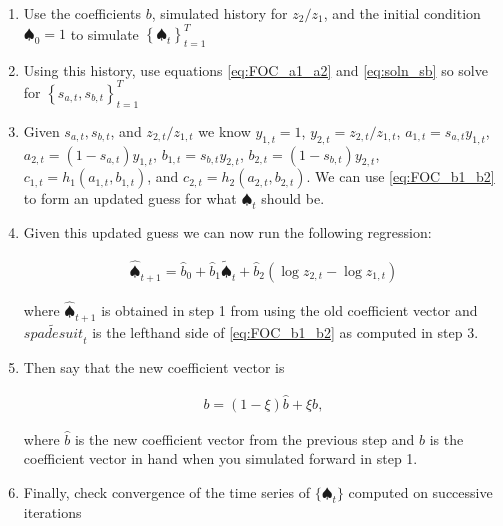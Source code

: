 \documentclass[19pt]{article}
\begin{document}
\begin{enumerate}
  \item Use the coefficients $b$, simulated history for $z_2/z_1$, and the initial condition $\spadesuit_0 = 1$ to simulate $\left\{ \spadesuit_t \right\}_{t=1}^{T}$
  \item Using this history, use equations \eqref{eq:FOC_a1_a2} and \eqref{eq:soln_sb} so solve for $\left\{ s_{a,t}, s_{b,t} \right\}_{t=1}^{T}$
  \item Given $s_{a,t}, s_{b,t}$, and $z_{2,t}/z_{1,t}$ we know $y_{1,t}=1$, $y_{2,t} = z_{2,t}/z_{1,t}$, $a_{1,t} = s_{a,t} y_{1,t}$, $a_{2,t} = (1-s_{a,t}) y_{1,t}$, $b_{1,t} = s_{b,t} y_{2,t}$, $b_{2,t} = (1-s_{b,t}) y_{2,t}$, $c_{1,t} = h_1(a_{1,t}, b_{1,t})$, and $c_{2,t} = h_2(a_{2,t}, b_{2,t})$. We can use \eqref{eq:FOC_b1_b2} to form an updated guess for what $\spadesuit_t$ should be.
  \item Given this updated guess we can now run the following regression:

    \begin{align*}
      \hat{\spadesuit}_{t+1} = \hat{b}_0 + \hat{b}_1 \tilde{\spadesuit}_t + \hat{b}_2 (\log z_{2,t} - \log z_{1,t})
    \end{align*}

    where $\hat{\spadesuit}_{t+1}$ is obtained in step 1 from using the old coefficient vector and $\tilde{spadesuit}_t$ is the lefthand side of \eqref{eq:FOC_b1_b2} as computed in step 3.
  \item Then say that the new coefficient vector is

    \begin{align*}
      b = (1 - \xi) \hat{b} + \xi b,
    \end{align*}

    where $\hat{b}$ is the new coefficient vector from the previous step and $b$ is the coefficient vector in hand when you simulated forward in step 1.

  \item Finally, check convergence of the time series of $\{\spadesuit_t\}$ computed on successive iterations
\end{enumerate}
\end{document}
